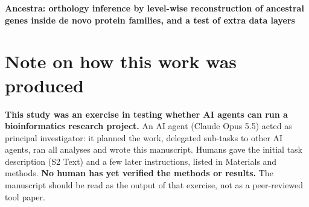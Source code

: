 \documentclass[10pt,letterpaper]{article}
\begin{document}
\vspace*{0.2in}

\begin{flushleft}
{\Large
\textbf{Ancestra: orthology inference by level-wise reconstruction of ancestral genes inside de novo protein families, and a test of extra data layers}
}
\end{flushleft}

\section*{Note on how this work was produced}
\textbf{This study was an exercise in testing whether AI agents can run a bioinformatics research project.} An AI agent (Claude Opus 5.5) acted as principal investigator: it planned the work, delegated sub-tasks to other AI agents, ran all analyses and wrote this manuscript. Humans gave the initial task description (S2 Text) and a few later instructions, listed in Materials and methods. \textbf{No human has yet verified the methods or results.} The manuscript should be read as the output of that exercise, not as a peer-reviewed tool paper.
\end{document}
